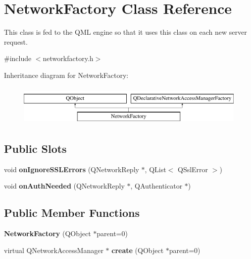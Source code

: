\hypertarget{classNetworkFactory}{\section{Network\-Factory Class Reference}
\label{classNetworkFactory}
}


This class is fed to the Q\-M\-L engine so that it uses this class on each new server request.  




{\ttfamily \#include $<$networkfactory.\-h$>$}

Inheritance diagram for Network\-Factory\-:\begin{figure}[H]
\begin{center}
\leavevmode
\includegraphics[height=2.000000cm]{classNetworkFactory}
\end{center}
\end{figure}
\subsection*{Public Slots}
\begin{DoxyCompactItemize}
\item 
\hypertarget{classNetworkFactory_abd29b95726eecc9d617b6585ce2fcb03}{void {\bfseries on\-Ignore\-S\-S\-L\-Errors} (Q\-Network\-Reply $\ast$, Q\-List$<$ Q\-Ssl\-Error $>$)}\label{classNetworkFactory_abd29b95726eecc9d617b6585ce2fcb03}

\item 
\hypertarget{classNetworkFactory_ae9078cc80c6fe15c0121d2c9aea489da}{void {\bfseries on\-Auth\-Needed} (Q\-Network\-Reply $\ast$, Q\-Authenticator $\ast$)}\label{classNetworkFactory_ae9078cc80c6fe15c0121d2c9aea489da}

\end{DoxyCompactItemize}
\subsection*{Public Member Functions}
\begin{DoxyCompactItemize}
\item 
\hypertarget{classNetworkFactory_aac6aff662a45cc52031ec39f1631be3d}{{\bfseries Network\-Factory} (Q\-Object $\ast$parent=0)}\label{classNetworkFactory_aac6aff662a45cc52031ec39f1631be3d}

\item 
\hypertarget{classNetworkFactory_a3d48936e4b8f27a60b8277bc52b2eb9d}{virtual Q\-Network\-Access\-Manager $\ast$ {\bfseries create} (Q\-Object $\ast$parent=0)}\label{classNetworkFactory_a3d48936e4b8f27a60b8277bc52b2eb9d}

\end{DoxyCompactItemize}


